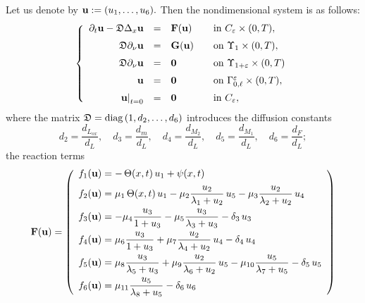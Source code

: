 \documentclass[reqno]{amsart}            %
\numberwithin{equation}{section}
\begin{document}
Let us denote by ${\bf u} := (u_1, \ldots, u_6).$ Then the nondimensional system is as follows:
\begin{equation}\label{start_prob}
\left\{
    \begin{array}{rcll}
    \partial_t {\bf u} - \mathfrak{D} \Delta_x {\bf u}  &=& {\bf F}({\bf u})
                    &\quad \mbox{in} \ C_{\varepsilon}\times (0,T),
                    \\[2mm]
 \mathfrak{D}  \partial_{\nu} {\bf u} &=&   {\bf G}({\bf u})
                    &\quad \mbox{on} \ \Upsilon_{1}\times (0,T),
                    \\[2mm]
 \mathfrak{D}  \partial_{\nu} {\bf u} &=&   {\bf 0}
                    &\quad \mbox{on} \ \Upsilon_{1+\varepsilon}\times (0,T)
                    \\[2mm]
  {\bf u} &=& {\bf 0}&\quad \text{on} \  \Gamma^\varepsilon_{0, \ell}\times (0,T),
 \\[2mm]
    \left. {\bf u}\right|_{t=0} &=&{\bf 0} &\quad \mbox{in} \   C_{\varepsilon},
   \end{array}\right.
\end{equation}
where  the matrix $\mathfrak{D} = {\rm diag}\left(1,d_2,\ldots,d_6\right)$
introduces  the diffusion  constants
$$
d_2=\frac{d_{L_{ox}}}{d_L}, \quad d_3=\frac{d_{m}}{d_L}, \quad d_4=\frac{d_{M_2}}{d_L},\quad d_5=\frac{d_{M_1}}{d_L},\quad d_6=\frac{d_{F}}{d_L};
$$
the reaction terms
\begin{equation}\label{reaction-term-1}
{\bf F}({\bf u}) = %
\left(
\begin{array}{l}
f_1({\bf u}) = - \, \Theta(x,t) \, u_1 +  \psi(x,t)
\\[2mm]
f_2({\bf u}) = \mu_1\, \Theta(x,t) \, u_1 - \mu_2 \dfrac{ u_2}{\lambda_1 + u_2} \, u_5 -  \mu_3 \dfrac{ u_2}{\lambda_2 + u_2} \, u_4
\\[3mm]
f_3({\bf u}) = -  \mu_4 \dfrac{ u_3}{1 + u_3}   - \mu_5 \dfrac{ u_3}{\lambda_3 + u_3} -  \delta_3 \, u_3
\\[3mm]
f_4({\bf u}) = \mu_6 \dfrac{ u_3}{1 + u_3}  + \mu_7 \dfrac{u_2}{\lambda_4 + u_2} \, u_4  -  \delta_4 \, u_4
\\[3mm]
f_5({\bf u}) = \mu_8 \dfrac{ u_3}{\lambda_5 + u_3}  +  \mu_9 \dfrac{u_2}{\lambda_6 + u_2} \, u_5 - \mu_{10} \dfrac{ u_5}{\lambda_7 + u_5}  - \delta_5 \, u_5
\\[3mm]
f_6({\bf u}) = \mu_{11} \dfrac{ u_5}{\lambda_8 + u_5}  - \delta_6 \, u_6
\end{array}
\right)
\end{equation}
\end{document}
